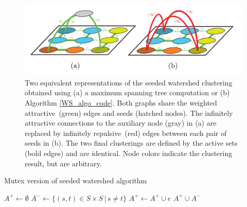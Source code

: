 \begin{figure}[t]
\centering
\includegraphics[width=\linewidth]{figures/MWS/images/seeded-WS.pdf}%
   \caption[Two equivalent representations of the seeded watershed clustering]{Two equivalent representations of the seeded watershed clustering obtained using (a) a maximum spanning tree computation or (b) Algorithm \ref{WS_algo_code}. Both graphs share the weighted attractive~(green) edges and seeds (hatched nodes). The infinitely attractive connections to the auxiliary node (gray) in (a) are replaced by infinitely repulsive~(red) edges between each pair of seeds in (b). The two final clusterings are defined by the active sets (bold edges) and are identical. Node colors indicate the clustering result, but are arbitrary.}
\label{fig:WS_compare}
\end{figure}




\begin{algorithm}[t]
  \caption{Mutex version of seeded watershed algorithm}

  \begin{algorithmic}[1]
        \State $A^+ \leftarrow \emptyset$\; 
        \State $A^- \leftarrow \{ (s,t) \in S \times S \,|\, s \neq t \} $ %
                \State $A^+ \leftarrow A^+ \cup e$ 
            \EndIf
        \EndFor
        \State
        \Return $A^+ \cup A^-$
      \EndProcedure
  \end{algorithmic}
 \label{WS_algo_code}
\end{algorithm}


